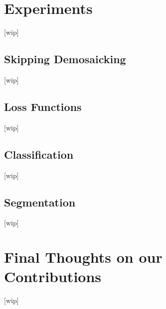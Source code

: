 \chapter{Experiments}
[wip]

\section{Skipping Demosaicking}
[wip]

\section{Loss Functions}
[wip]

\section{Classification}
[wip]

\section{Segmentation}
[wip]


\chapter{Final Thoughts on our Contributions}
[wip]
